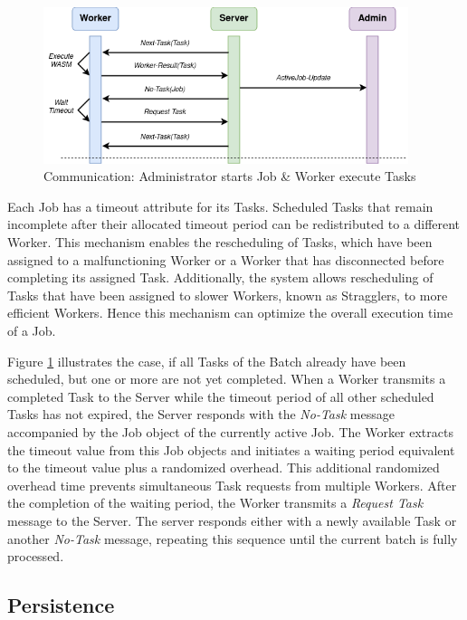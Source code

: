 \begin{figure}[htbp]
    \centering
    \includegraphics[width=0.95\textwidth]{gfx/figures/communication-timeout.png}
    \caption{Communication: Administrator starts Job \& Worker execute Tasks}
    \label{fig:implementation:communication3}
\end{figure}

Each Job has a timeout attribute for its Tasks. Scheduled Tasks that remain incomplete after their allocated timeout period can be redistributed to a different Worker. This mechanism enables the rescheduling of Tasks, which have been assigned to a malfunctioning Worker or a Worker that has disconnected before completing its assigned Task. Additionally, the system allows rescheduling of Tasks that have been assigned to slower Workers, known as Stragglers, to more efficient Workers. Hence this mechanism can optimize the overall execution time of a Job.

Figure \ref{fig:implementation:communication3} illustrates the case, if all Tasks of the Batch already have been scheduled, but one or more are not yet completed. When a Worker transmits a completed Task to the Server while the timeout period of all other scheduled Tasks has not expired, the Server responds with the \emph{No-Task} message accompanied by the Job object of the currently active Job. The Worker extracts the timeout value from this Job objects and initiates a waiting period equivalent to the timeout value plus a randomized overhead. This additional randomized overhead time prevents simultaneous Task requests from multiple Workers. After the completion of the waiting period, the Worker transmits a \emph{Request Task} message to the Server. The server responds either with a newly available Task or another \emph{No-Task} message, repeating this sequence until the current batch is fully processed.

\subsection{Persistence}
\label{subsec:implementation:architecture:persistence}


